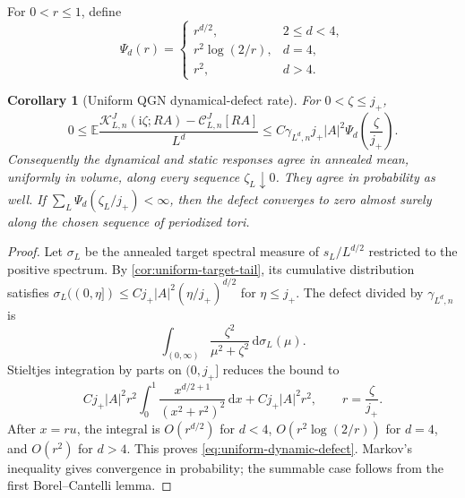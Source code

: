 \documentclass[11pt]{article}
\newtheorem{corollary}[theorem]{Corollary}
\theoremstyle{definition}
\theoremstyle{remark}
\newcommand{\I}{\mathrm i}
\newcommand{\E}{\mathbb E}
\newcommand{\cC}{\mathcal C}
\newcommand{\cK}{\mathcal K}
\newcommand{\abs}[1]{\left\lvert #1\right\rvert}
\newcommand{\dd}{\,\mathrm d}
\begin{document}
For $0<r\le1$, define
\begin{equation}
 \Psi_d(r)=
 \begin{cases}
 r^{d/2},&2\le d<4,\\
 r^2\log(2/r),&d=4,\\
 r^2,&d>4.
 \end{cases}
 \label{eq:Psi-dynamic-rate}
\end{equation}

\begin{corollary}[Uniform QGN dynamical-defect rate]
\label{cor:uniform-dynamic-rate}
For $0<\zeta\le j_+$,
\begin{equation}
 \boxed{
 0\le
 \E\frac{\cK_{L,n}^{J}(\I\zeta;RA)-\cC_{L,n}^{J}[RA]}{L^d}
 \le C\gamma_{L^d,n}j_+\abs{A}^2
 \Psi_d\left(\frac\zeta{j_+}\right).}
 \label{eq:uniform-dynamic-defect}
\end{equation}
Consequently the dynamical and static responses agree in annealed mean, uniformly in volume, along every sequence $\zeta_L\downarrow0$.  They agree in probability as well.  If
$\sum_L\Psi_d(\zeta_L/j_+)<\infty$, then the defect converges to zero almost surely along the chosen sequence of periodized tori.
\end{corollary}

\begin{proof}
Let $\sigma_L$ be the annealed target spectral measure of $s_L/L^{d/2}$ restricted to the positive spectrum.  By \cref{cor:uniform-target-tail}, its cumulative distribution satisfies
$\sigma_L((0,\eta])\le Cj_+\abs{A}^2(\eta/j_+)^{d/2}$ for $\eta\le j_+$.  The defect divided by $\gamma_{L^d,n}$ is
\[
 \int_{(0,\infty)}\frac{\zeta^2}{\mu^2+\zeta^2}\dd\sigma_L(\mu).
\]
Stieltjes integration by parts on $(0,j_+]$ reduces the bound to
\[
 Cj_+\abs{A}^2 r^2
 \int_0^1\frac{x^{d/2+1}}{(x^2+r^2)^2}\dd x
 +Cj_+\abs{A}^2r^2,
 \qquad r=\frac\zeta{j_+}.
\]
After $x=ru$, the integral is $O(r^{d/2})$ for $d<4$, $O(r^2\log(2/r))$ for $d=4$, and $O(r^2)$ for $d>4$.  This proves \eqref{eq:uniform-dynamic-defect}.  Markov's inequality gives convergence in probability; the summable case follows from the first Borel--Cantelli lemma.
\end{proof}
\end{document}
